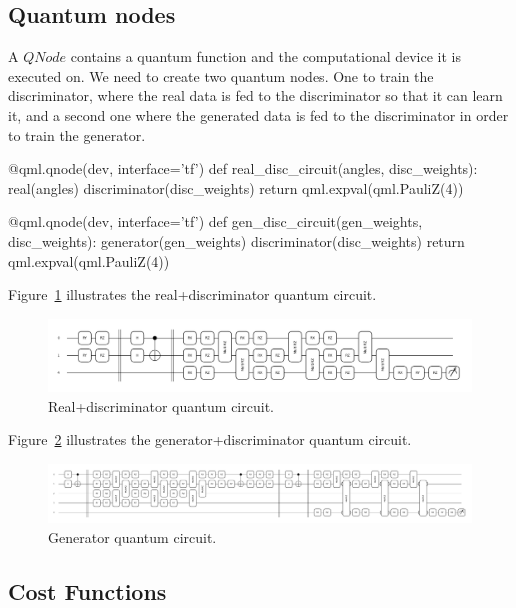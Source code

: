 \subsection{Quantum nodes}
\label{sec:qnode}

A $QNode$ contains a quantum function and the computational device it is 
executed on. We need to create two quantum nodes. One to train the discriminator,
where the real data is fed to the discriminator so that it can learn it, and a
second one where the generated data is fed to the discriminator in order to 
train the generator.
\begin{python}
@qml.qnode(dev, interface='tf')
def real_disc_circuit(angles, disc_weights):
    real(angles)
    discriminator(disc_weights)
    return qml.expval(qml.PauliZ(4))

@qml.qnode(dev, interface='tf')
def gen_disc_circuit(gen_weights, disc_weights):
    generator(gen_weights)
    discriminator(disc_weights)
    return qml.expval(qml.PauliZ(4)) 
\end{python}

Figure~\ref{fig:real_disc_cirq} illustrates the real+discriminator quantum 
circuit.

\begin{figure}[!htbp]
\centering
    \includegraphics[width=1\textwidth]{figures/real_disc_cirq.pdf}
\caption{Real+discriminator quantum circuit.}
\label{fig:real_disc_cirq}
\end{figure}

Figure~\ref{fig:gen_disc_cirq} illustrates the generator+discriminator quantum 
circuit.

\begin{figure}[!htbp]
\centering
    \includegraphics[width=1\textwidth]{figures/gen_disc_cirq.pdf}
\caption{Generator quantum circuit.}
\label{fig:gen_disc_cirq}
\end{figure}

\subsection{Cost Functions}
\label{sec:cost}


